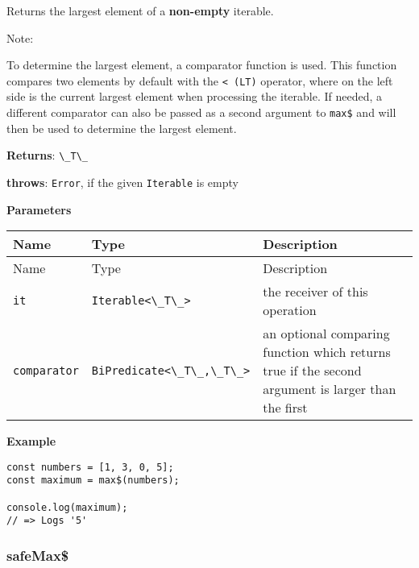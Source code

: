 Returns the largest element of a \textbf{non-empty} iterable.

Note:

To determine the largest element, a comparator function is used. This
function compares two elements by default with the
\passthrough{\lstinline!< (LT)!} operator, where on the left side is the
current largest element when processing the iterable. If needed, a
different comparator can also be passed as a second argument to
\passthrough{\lstinline!max$!} and will then be used to determine the
largest element.

\textbf{Returns}: \passthrough{\lstinline!\_T\_!}

\textbf{throws}: \passthrough{\lstinline!Error!}, if the given
\passthrough{\lstinline!Iterable!} is empty

\textbf{Parameters}

\begin{longtable}[]{
  >{\raggedright\arraybackslash}p{}
  >{\raggedright\arraybackslash}p{}
  >{\raggedright\arraybackslash}p{}@{}}

\toprule\noalign{}
Name & Type & Description \\
\midrule\noalign{}
\endfirsthead
\toprule\noalign{}
Name & Type & Description \\
\midrule\noalign{}
\endhead
\bottomrule\noalign{}
\endlastfoot
\passthrough{\lstinline!it!} & \passthrough{\lstinline!Iterable<\_T\_>!}
& the receiver of this operation \\
\passthrough{\lstinline!comparator!} &
\passthrough{\lstinline!BiPredicate<\_T\_,\_T\_>!} & an optional
comparing function which returns true if the second argument is larger
than the first \\
\end{longtable}

\textbf{Example}

\begin{lstlisting}[label=88fe2a41-ef34-4624-a8a7-c7571e410912]
const numbers = [1, 3, 0, 5];
const maximum = max$(numbers);
                              
console.log(maximum);
// => Logs '5'
\end{lstlisting}

\hypertarget{acc84b7e-1143-48cb-888d-767e0d324309}{%
\subsubsection{safeMax\$}\label{acc84b7e-1143-48cb-888d-767e0d324309}}

